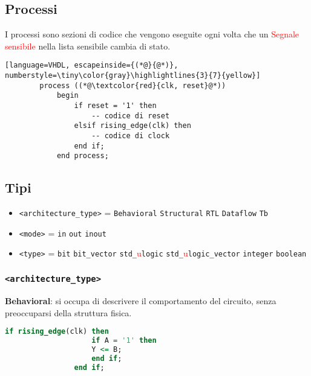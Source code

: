     \subsection{Processi}
        I processi sono sezioni di codice che vengono eseguite ogni volta che un \textcolor{red}{Segnale sensibile} nella lista sensibile cambia di stato.
        \begin{lstlisting}[language=VHDL, escapeinside={(*@}{@*)}, numberstyle=\tiny\color{gray}\highlightlines{3}{7}{yellow}]
        process ((*@\textcolor{red}{clk, reset}@*))
            begin
                if reset = '1' then
                    -- codice di reset
                elsif rising_edge(clk) then
                    -- codice di clock
                end if;
            end process;
        \end{lstlisting}


    \subsection{Tipi}
        \begin{itemize}
            \item \texttt{<architecture\_type>} = \texttt{Behavioral} \textbar{} \texttt{Structural} \textbar{} \texttt{RTL} \textbar{} \texttt{Dataflow} \textbar{} \texttt{Tb}
            \item \texttt{<mode>} = \texttt{in} \textbar{} \texttt{out} \textbar{} \texttt{inout}
            \item \texttt{<type>} = \texttt{bit} \textbar{} \texttt{bit\_vector} \textbar{} \texttt{std\_}\textcolor{red}{u}\texttt{logic} \textbar{} \texttt{std\_}\textcolor{red}{u}\texttt{logic\_vector} \textbar{} \texttt{integer} \textbar{} \texttt{boolean}
        \end{itemize}
        


        \subsubsection{\texttt{<architecture\_type>}}
            \textbf{Behavioral}: si occupa di descrivere il comportamento del circuito, senza preoccuparsi della struttura fisica.
            \begin{lstlisting}[language=VHDL]
                if rising_edge(clk) then
                    if A = '1' then
                    Y <= B;
                    end if;
                end if;
            \end{lstlisting}

